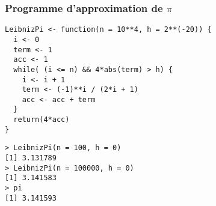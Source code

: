 \documentclass[10pt]{beamer}
\begin{document}
\begin{frame}[fragile]
  \frametitle{Programme d'approximation de $\pi$}
  \begin{lstlisting}[style=editor]
LeibnizPi <- function(n = 10**4, h = 2**(-20)) {
  i <- 0
  term <- 1
  acc <- 1
  while( (i <= n) && 4*abs(term) > h) {
    i <- i + 1
    term <- (-1)**i / (2*i + 1)
    acc <- acc + term
  }
  return(4*acc)
}
\end{lstlisting}

\begin{lstlisting}
> LeibnizPi(n = 100, h = 0)
[1] 3.131789
> LeibnizPi(n = 100000, h = 0)
[1] 3.141583
> pi
[1] 3.141593
\end{lstlisting}

\end{frame}
\end{document}

